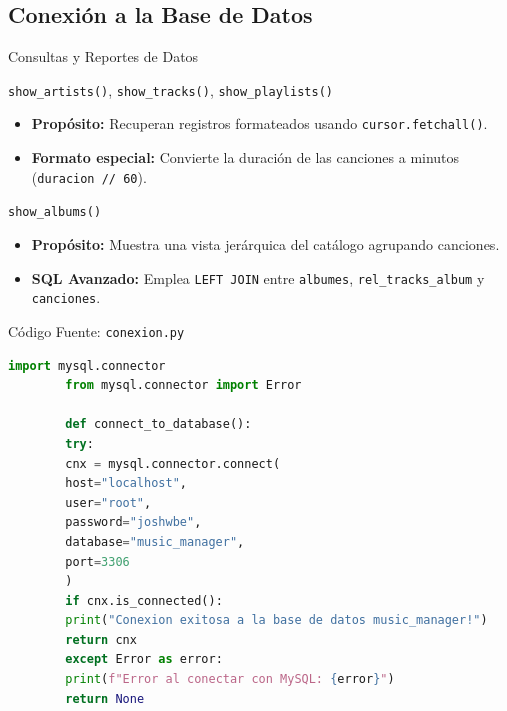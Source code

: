 \documentclass[aspectratio=169, 10pt]{beamer}
\begin{document}
\subsection{Conexión a la Base de Datos}

\begin{frame}[t]{Consultas y Reportes de Datos}
	\small
	\begin{block}{\texttt{show\_artists()}, \texttt{show\_tracks()}, \texttt{show\_playlists()}}
		\begin{itemize}
			\item \textbf{Propósito:} Recuperan registros formateados usando \texttt{cursor.fetchall()}.
			\item \textbf{Formato especial:} Convierte la duración de las canciones a minutos (\texttt{duracion // 60}).
		\end{itemize}
	\end{block}
	
	\begin{block}{\texttt{show\_albums()}}
		\begin{itemize}
			\item \textbf{Propósito:} Muestra una vista jerárquica del catálogo agrupando canciones.
			\item \textbf{SQL Avanzado:} Emplea \texttt{LEFT JOIN} entre \texttt{albumes}, \texttt{rel\_tracks\_album} y \texttt{canciones}.
		\end{itemize}
	\end{block}
\end{frame}

\begin{frame}[fragile]{Código Fuente: \texttt{conexion.py}}
	\begin{lstlisting}[language=Python]
		import mysql.connector
		from mysql.connector import Error
		
		def connect_to_database():
		try:
		cnx = mysql.connector.connect(
		host="localhost",
		user="root",
		password="joshwbe",
		database="music_manager", 
		port=3306
		)
		if cnx.is_connected():
		print("Conexion exitosa a la base de datos music_manager!")
		return cnx
		except Error as error:
		print(f"Error al conectar con MySQL: {error}")
		return None
	\end{lstlisting}
\end{frame}

\end{document}
